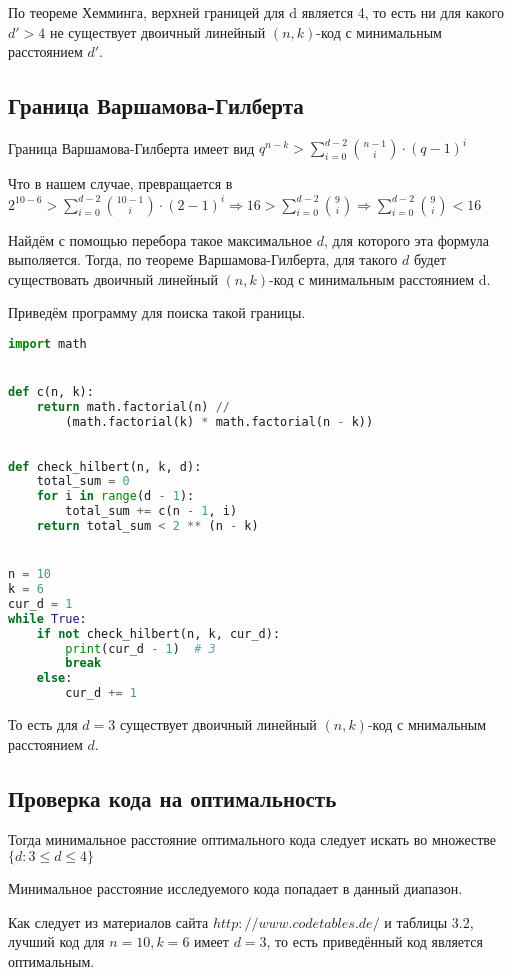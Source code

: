 \documentclass{article}
\begin{document}
	По теореме Хемминга, верхней границей для d является 4, то есть ни для какого $d' > 4$ не существует двоичный линейный $(n, k)$-код с минимальным расстоянием $d'$.

	\subsection{Граница Варшамова-Гилберта}
	
	Граница Варшамова-Гилберта имеет вид $q^{n - k} > \sum\limits_{i = 0}^{d - 2} \binom{n - 1}{i} \cdot (q - 1)^i$
	
	Что в нашем случае, превращается в $2^{10 - 6} > \sum\limits_{i = 0}^{d - 2} \binom{10 - 1}{i} \cdot (2 - 1)^i \Rightarrow  16 > \sum\limits_{i = 0}^{d - 2} \binom{9}{i} \Rightarrow \sum\limits_{i = 0}^{d - 2} \binom{9}{i} < 16$
	
	Найдём с помощью перебора такое максимальное $d$, для которого эта формула выполяется. Тогда, по теореме Варшамова-Гилберта, для такого $d$ будет существовать двоичный линейный $(n, k)$-код с минимальным расстоянием d.
	
	Приведём программу для поиска такой границы.
	
	\begin{lstlisting}[language=python]
import math


def c(n, k):
	return math.factorial(n) // 
		(math.factorial(k) * math.factorial(n - k))	
	
	
def check_hilbert(n, k, d):
	total_sum = 0
	for i in range(d - 1):
		total_sum += c(n - 1, i)
	return total_sum < 2 ** (n - k)


n = 10
k = 6
cur_d = 1
while True:
	if not check_hilbert(n, k, cur_d):
		print(cur_d - 1)  # 3
		break
	else:
		cur_d += 1
	\end{lstlisting}
	
	То есть для $d = 3$ существует двоичный линейный $(n, k)$-код с мнимальным расстоянием $d$.
	
	\subsection{Проверка кода на оптимальность}
	Тогда минимальное расстояние оптимального кода следует искать во множестве $\{d: 3 \leq d \leq 4\}$
	
	Минимальное расстояние исследуемого кода попадает в данный диапазон.
	
	Как следует из материалов сайта $http://www.codetables.de/$ и таблицы $3.2$, лучший код для $n = 10, k = 6$ имеет $d = 3$, то есть приведённый код является оптимальным.
	
\end{document}
